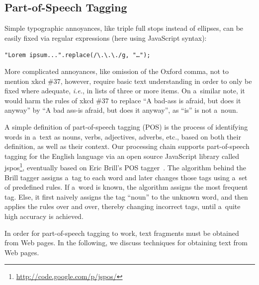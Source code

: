\documentclass{acm_proc_article-sp}
\let\oldemph\emph
\renewcommand{\emph}[1]{\oldemph{\fontsize{9}{9}\selectfont #1}}
\newcommand{\inlinelistingsize}{\fontsize{8pt}{11pt}}
\let\oldurl\url
\renewcommand{\url}[1]{\inlinelistingsize\oldurl{#1}}
\begin{document}
\subsection{Part-of-Speech Tagging}
Simple typographic annoyances, like triple full stops instead of ellipses, can be easily fixed via regular expressions (here using JavaScript syntax):

\noindent \texttt{"Lorem ipsum...".replace(/\textbackslash.\textbackslash.\textbackslash./g, "\ldots");}

More complicated annoyances, like omission of the Oxford comma, not to mention xkcd \#37, however,
require basic text understanding in order to only be fixed where adequate, \emph{i.e.}, 
in lists of three or more items.
On a~similar note, it would harm the rules of xkcd \#37 to replace ``A bad-ass is afraid, but does it anyway'' by ``A bad ass-is afraid, but does it anyway'', as ``is'' is not a~noun.

A simple definition of part-of-speech tagging (POS) is the process of identifying words in a~text as nouns, verbs, adjectives, adverbs, etc., based on both their definition, as well as their context.
Our processing chain supports part-of-speech tagging for the English language via an open source JavaScript library called jspos\footnote{\url{http://code.google.com/p/jspos/}},
eventually based on Eric Brill's POS tagger~\cite{brill1992simple}.
The algorithm behind the Brill tagger assigns a~tag to each word and later changes those tags using a~set of predefined rules.
If a~word is known, the algorithm assigns the most frequent tag.
Else, it first naively assigns the tag ``noun'' to the unknown word,
and then applies the rules over and over, thereby changing incorrect tags,
until a~quite high accuracy is achieved.

In order for part-of-speech tagging to work, text fragments must be obtained from Web pages.
In the following, we discuss techniques for obtaining text from Web pages.
\end{document}
